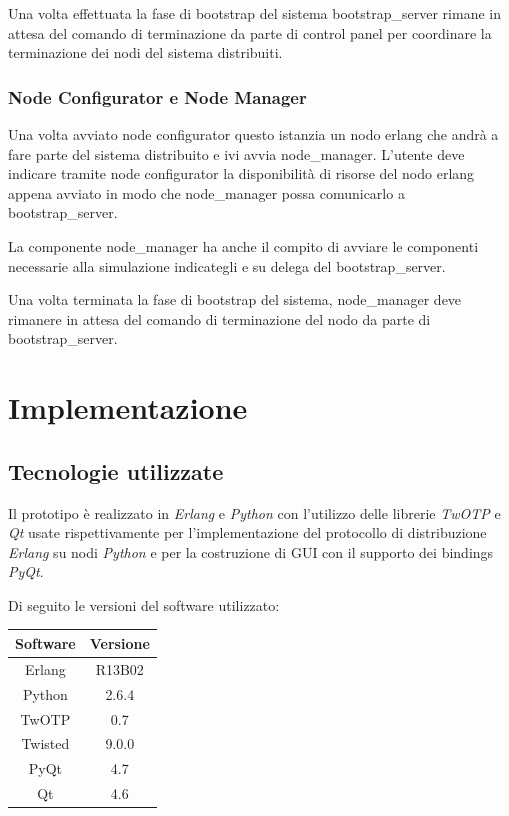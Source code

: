 \documentclass[11pt,a4paper]{report}
\begin{document}
Una volta effettuata la fase di bootstrap del sistema bootstrap\_server rimane in attesa del comando di terminazione da parte di control panel per coordinare la terminazione dei nodi del sistema distribuiti.

\subsection*{Node Configurator e Node Manager}
Una volta avviato node configurator questo istanzia un nodo erlang che andrà a fare parte del sistema distribuito e ivi avvia node\_manager. L'utente deve indicare tramite node configurator la disponibilità di risorse del nodo erlang appena avviato in modo che node\_manager possa comunicarlo a bootstrap\_server.

La componente node\_manager ha anche il compito di avviare le componenti necessarie alla simulazione indicategli e su delega del bootstrap\_server.

Una volta terminata la fase di bootstrap del sistema, node\_manager deve rimanere in attesa del comando di terminazione del nodo da parte di bootstrap\_server.

\chapter{Implementazione}
\section{Tecnologie utilizzate}
Il prototipo è realizzato in \textit{Erlang} e \textit{Python} con l'utilizzo delle librerie \textit{TwOTP} e \textit{Qt} usate rispettivamente per l'implementazione del protocollo di distribuzione \textit{Erlang} su nodi \textit{Python} e per la costruzione di GUI con il supporto dei bindings \textit{PyQt}.

Di seguito le versioni del software utilizzato:
\begin{center}
\begin{tabular}{c|c}
\textbf{Software} & \textbf{Versione}\\
\hline
Erlang & R13B02\\
\hline
Python & 2.6.4\\
\hline
TwOTP & 0.7\\
Twisted & 9.0.0\\
\hline
PyQt & 4.7\\
Qt & 4.6\\
\end{tabular}
\end{center}
\end{document}

